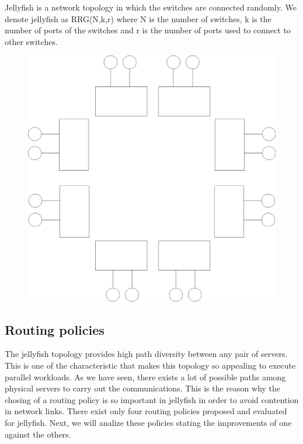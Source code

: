 \documentclass{sig-alternate}
\begin{document}
Jellyfish is a network topology in which the switches are connected randomly. We denote jellyfish as RRG(N,k,r) where N is the number of switches, k is the number of ports of the switches and r is the number of ports used to connect to other switches.  
\begin{figure}[t]
    \centering 
    \includegraphics[width=\linewidth]{figures/jellyfish.eps}
    \caption{}
    \label{fig:jellyfish}
\end{figure}


\subsection{Routing policies}
\label{subsec:routing}

The jellyfish topology provides high path diversity between any pair of servers. This is one of the characteristic that makes this topology so appealing to execute parallel workloads. As we have seen, there exists a lot of possible paths among physical servers to carry out the communications. This is the reason why the chosing of a routing policy is so important in jellyfish in order to avoid contention in network links. There exist only four routing policies proposed and evaluated for jellyfish. Next, we will analize these policies stating the improvements of one against the others.
\end{document}

